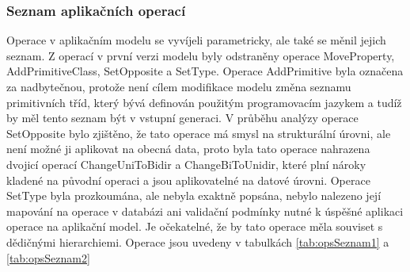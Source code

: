 \documentclass[11pt,twoside,a4paper]{book}
\begin{document}
\subsubsection{Seznam aplikačních operací}

Operace v aplikačním modelu se vyvíjeli parametricky, ale také se měnil jejich
seznam. Z operací v první verzi modelu byly odstraněny operace MoveProperty,
AddPrimitiveClass, SetOpposite a SetType. Operace AddPrimitive byla označena za
nadbytečnou, protože není cílem modifikace modelu změna seznamu primitivních tříd, který bývá
definován použitým programovacím jazykem a tudíž by měl tento seznam být v
vstupní generaci. V průběhu analýzy operace SetOpposite bylo zjištěno, že tato
operace má smysl na strukturální úrovni, ale není možné ji aplikovat na obecná
data, proto byla tato operace nahrazena dvojicí operací ChangeUniToBidir a
ChangeBiToUnidir, které plní nároky kladené na původní operaci a jsou
aplikovatelné na datové úrovni. Operace SetType byla prozkoumána, ale
nebyla exaktně popsána, nebylo nalezeno její mapování na operace v databázi ani
validační podmínky nutné k úspěšné aplikaci operace na aplikační model. Je
očekatelné, že by tato operace měla souviset s dědičnými hierarchiemi. Operace
jsou uvedeny v tabulkách \ref{tab:opsSeznam1} a \ref{tab:opsSeznam2}
\end{document}
